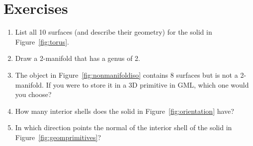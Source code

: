 %
\section{Exercises}

\begin{enumerate}
  \item List all 10 surfaces (and describe their geometry) for the solid in Figure~\ref{fig:torus}.
  \item Draw a 2-manifold that has a genus of 2.
  \item The object in Figure~\ref{fig:nonmanifoldiso} contains 8 surfaces but is not a 2-manifold. If you were to store it in a 3D primitive in GML, which one would you choose? 
  \item How many interior shells does the solid in Figure~\ref{fig:orientation} have?
  \item In which direction points the normal of the interior shell of the solid in Figure~\ref{fig:geomprimitives}?
\end{enumerate}
